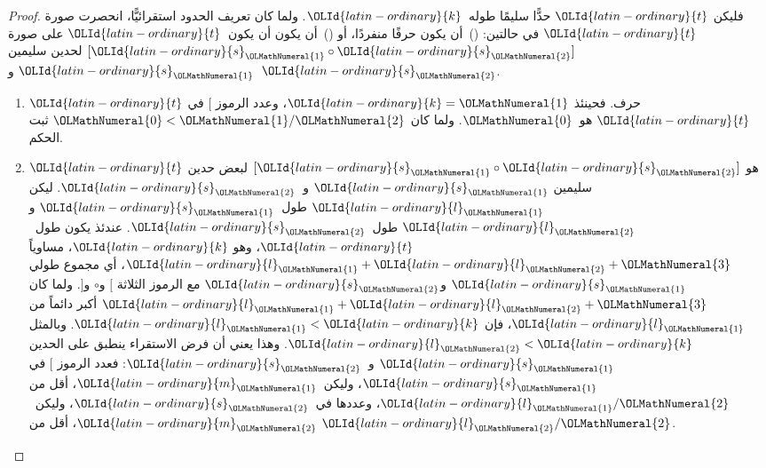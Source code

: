 \documentclass[../../../include/open-logic-section]{subfiles}
\begin{document}
\begin{proof}
فليكن ${\OLId{latin-ordinary}{t}}$ حدًّا سليمًا طوله~${\OLId{latin-ordinary}{k}}$. ولما كان تعريف الحدود استقرائيًّا،
انحصرت صورة ${\OLId{latin-ordinary}{t}}$ في حالتين: ()~أن يكون حرفًا منفردًا، أو ()~أن يكون
  أن يكون~${\OLId{latin-ordinary}{t}}$ على صورة $[{\OLId{latin-ordinary}{s}}_{\OLMathNumeral{1}} \circ {\OLId{latin-ordinary}{s}}_{\OLMathNumeral{2}}]$ لحدين سليمين ${\OLId{latin-ordinary}{s}}_{\OLMathNumeral{1}}$ و~${\OLId{latin-ordinary}{s}}_{\OLMathNumeral{2}}$.
\begin{enumerate}
\item ${\OLId{latin-ordinary}{t}}$ حرف. فحينئذ ${\OLId{latin-ordinary}{k}} = {\OLMathNumeral{1}}$، وعدد الرموز $[$ في ${\OLId{latin-ordinary}{t}}$ هو~${\OLMathNumeral{0}}$.
ولما كان ${\OLMathNumeral{0}} < {\OLMathNumeral{1}}/{\OLMathNumeral{2}}$ ثبت الحكم.
\item ${\OLId{latin-ordinary}{t}}$ هو $[{\OLId{latin-ordinary}{s}}_{\OLMathNumeral{1}} \circ {\OLId{latin-ordinary}{s}}_{\OLMathNumeral{2}}]$ لبعض حدين سليمين ${\OLId{latin-ordinary}{s}}_{\OLMathNumeral{1}}$ و~${\OLId{latin-ordinary}{s}}_{\OLMathNumeral{2}}$.
  ليكن ${\OLId{latin-ordinary}{l}}_{\OLMathNumeral{1}}$ طول~${\OLId{latin-ordinary}{s}}_{\OLMathNumeral{1}}$ و${\OLId{latin-ordinary}{l}}_{\OLMathNumeral{2}}$ طول~${\OLId{latin-ordinary}{s}}_{\OLMathNumeral{2}}$. عندئذ يكون طول~${\OLId{latin-ordinary}{t}}$، وهو
  ${\OLId{latin-ordinary}{k}}$، مساوياً ${\OLId{latin-ordinary}{l}}_{\OLMathNumeral{1}}+{\OLId{latin-ordinary}{l}}_{\OLMathNumeral{2}}+{\OLMathNumeral{3}}$، أي مجموع طولي ${\OLId{latin-ordinary}{s}}_{\OLMathNumeral{1}}$ و${\OLId{latin-ordinary}{s}}_{\OLMathNumeral{2}}$ مع الرموز
  الثلاثة $[$ و$\circ$ و$]$. ولما كان ${\OLId{latin-ordinary}{l}}_{\OLMathNumeral{1}}+{\OLId{latin-ordinary}{l}}_{\OLMathNumeral{2}}+{\OLMathNumeral{3}}$ أكبر دائماً من
  ${\OLId{latin-ordinary}{l}}_{\OLMathNumeral{1}}$، فإن ${\OLId{latin-ordinary}{l}}_{\OLMathNumeral{1}} < {\OLId{latin-ordinary}{k}}$. وبالمثل ${\OLId{latin-ordinary}{l}}_{\OLMathNumeral{2}} < {\OLId{latin-ordinary}{k}}$. وهذا يعني أن فرض
  الاستقراء ينطبق على الحدين ${\OLId{latin-ordinary}{s}}_{\OLMathNumeral{1}}$ و~${\OLId{latin-ordinary}{s}}_{\OLMathNumeral{2}}$: فعدد الرموز $[$ في
  ${\OLId{latin-ordinary}{s}}_{\OLMathNumeral{1}}$، وليكن~${\OLId{latin-ordinary}{m}}_{\OLMathNumeral{1}}$، أقل من ${\OLId{latin-ordinary}{l}}_{\OLMathNumeral{1}}/{\OLMathNumeral{2}}$، وعددها في~${\OLId{latin-ordinary}{s}}_{\OLMathNumeral{2}}$، وليكن~${\OLId{latin-ordinary}{m}}_{\OLMathNumeral{2}}$،
  أقل من ${\OLId{latin-ordinary}{l}}_{\OLMathNumeral{2}}/{\OLMathNumeral{2}}$.


\end{enumerate}
\end{proof}
\end{document}
